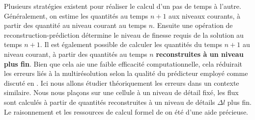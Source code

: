             Plusieurs stratégies existent pour réaliser le calcul d'un pas de temps à l'autre. Généralement, on estime les quantités au temps $n+1$ aux niveaux courants, 
            à partir des quantité au niveau courant au temps $n$. Ensuite une opération de reconstruction-prédiction détermine le niveau de finesse requis de la solution au temps $n+1$.
            Il est également possible de calculer les quantités du temps $n+1$ au niveau courant, à partir 
            des quantités au temps $n$ \textbf{reconstruites à un niveau plus fin}. Bien que cela aie une faible efficacité computationnelle, cela réduirait les erreurs liés à la multirésolution
            selon la qualité du prédicteur employé comme discuté en \cite{belloti_et_al_2025}. Ici nous allons étudier théoriquement les erreurs dans un contexte similaire. 
            Nous nous plaçons sur une cellule à un niveau de détail fixé, les flux sont calculés à partir de quantités reconstruites à un niveau de détails $\Delta l$ plus fin.
            Le raisonnement et les ressources de calcul formel de \cite{belloti_et_al_2025} on été d'une aide précieuse.

